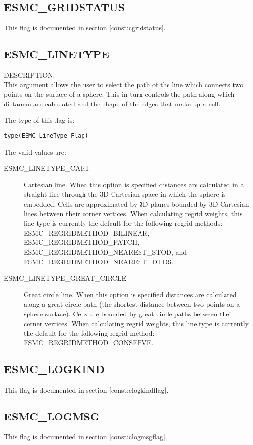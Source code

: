 \subsection{ESMC\_GRIDSTATUS}
This flag is documented in section \ref{const:cgridstatus}.

\subsection{ESMC\_LINETYPE}
\label{opt:lineType}

{\sf DESCRIPTION:\\}  This argument allows the user to select the path of the line which connects two points on the surface of a sphere.
This in turn controls the path along which distances are calculated and the shape of the edges that make up a cell.

The type of this flag is:

{\tt type(ESMC\_LineType\_Flag)}

The valid values are:
\begin{description}
\item [ESMC\_LINETYPE\_CART]
   Cartesian line. When this option is specified distances are calculated in a straight line through the 3D Cartesian space
   in which the sphere is embedded. Cells are approximated by 3D planes bounded by 3D Cartesian lines between their corner vertices.
   When calculating regrid weights, this line type is currently the default for the following regrid methods: ESMC\_REGRIDMETHOD\_BILINEAR,
   ESMC\_REGRIDMETHOD\_PATCH, ESMC\_REGRIDMETHOD\_NEAREST\_STOD, and  ESMC\_REGRIDMETHOD\_NEAREST\_DTOS.
\item [ESMC\_LINETYPE\_GREAT\_CIRCLE]
   Great circle line. When this option is specified distances are calculated along a great circle path (the shortest distance
   between two points on a sphere surface). Cells are bounded by great circle paths between their corner vertices. When calculating regrid
   weights, this line type is currently the default for the following regrid method: ESMC\_REGRIDMETHOD\_CONSERVE.
\end{description}


\subsection{ESMC\_LOGKIND}
This flag is documented in section \ref{const:clogkindflag}.

\subsection{ESMC\_LOGMSG}
This flag is documented in section \ref{const:clogmsgflag}.

